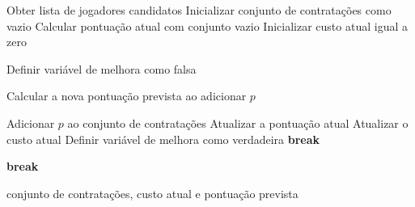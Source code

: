 \begin{algorithm}[H]
\caption{Algoritmo guloso com estratégia \textit{first improvement}}
\label{alg:guloso_first}
\begin{algorithmic}

\State Obter lista de jogadores candidatos
\State Inicializar conjunto de contratações como vazio
\State Calcular pontuação atual com conjunto vazio
\State Inicializar custo atual igual a zero

    \State Definir variável de melhora como falsa

            \State Calcular a nova pontuação prevista ao adicionar $p$

                \State Adicionar $p$ ao conjunto de contratações
                \State Atualizar a pontuação atual
                \State Atualizar o custo atual
                \State Definir variável de melhora como verdadeira
                \State \textbf{break} 
            \EndIf
        \EndIf
    \EndFor

        \State \textbf{break}
    \EndIf
\EndWhile

\State \Return conjunto de contratações, custo atual e pontuação prevista

\end{algorithmic}
\end{algorithm}